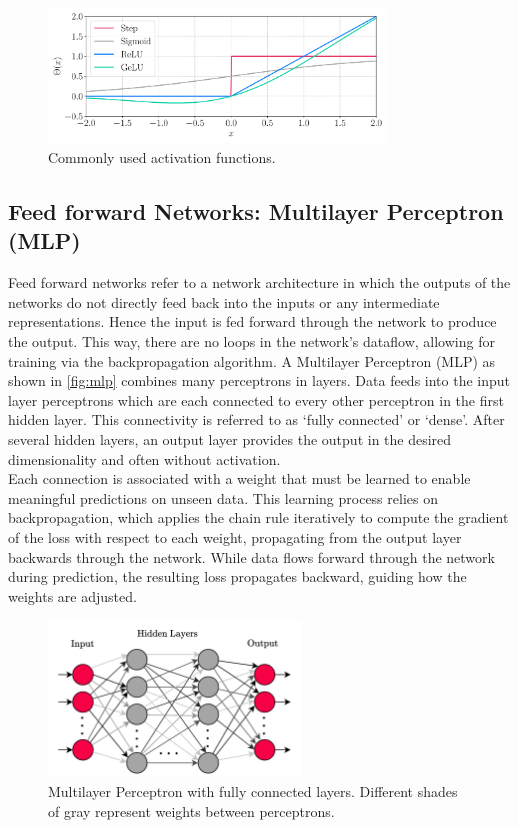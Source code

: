 \begin{figure}[H]
    \centering
    \includegraphics[width=0.8\textwidth]{../fig/background/activation_functions.pdf}
    \caption{Commonly used activation functions.}
    \label{fig:activation_functions}
\end{figure}
\subsection{Feed forward Networks: Multilayer Perceptron (MLP)}
\label{subsec:background_mlp}
Feed forward networks refer to a network architecture in which the outputs of the networks do not directly feed back into the inputs or any intermediate representations. Hence the input is fed forward through the network to produce the output. This way, there are no loops in the network's dataflow, allowing for training via the backpropagation algorithm. A Multilayer Perceptron (MLP) as shown in \autoref{fig:mlp} combines many perceptrons in layers. Data feeds into the input layer perceptrons which are each connected to every other perceptron in the first hidden layer. This connectivity is referred to as `fully connected' or `dense'. After several hidden layers, an output layer provides the output in the desired dimensionality and often without activation.\\
Each connection is associated with a weight that must be learned to enable meaningful predictions on unseen data. This learning process relies on backpropagation, which applies the chain rule iteratively to compute the gradient of the loss with respect to each weight, propagating from the output layer backwards through the network. While data flows forward through the network during prediction, the resulting loss propagates backward, guiding how the weights are adjusted. \\
\begin{figure}[h]
    \centering
    \includegraphics[width=0.6\textwidth]{../fig/background/MLP.pdf}
    \caption[Multilayer Perceptron]{Multilayer Perceptron with fully connected layers. Different shades of gray represent weights between perceptrons.}
    \label{fig:mlp}
\end{figure}

